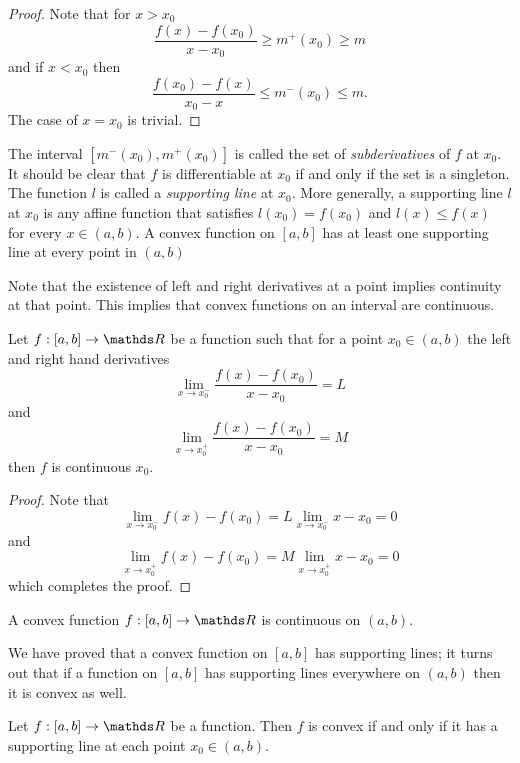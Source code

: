 \begin{proof}
Note that for $x>x_{0}$
\[
\frac{f\left(x\right)-f\left(x_{0}\right)}{x-x_{0}}\geq m^{+}\left(x_{0}\right)\geq m
\]
and if $x<x_{0}$ then 
\[
\frac{f\left(x_{0}\right)-f\left(x\right)}{x_{0}-x}\leq m^{-}\left(x_{0}\right)\leq m.
\]
 The case of $x=x_{0}$ is trivial.
\end{proof}
\begin{rem*}
The interval $\left[m^{-}\left(x_{0}\right),m^{+}\left(x_{0}\right)\right]$
is called the set of \emph{subderivatives }of $f$ at $x_{0}$. It
should be clear that $f$ is differentiable at $x_{0}$ if and only
if the set is a singleton. The function $l$ is called a \emph{supporting
line }at $x_{0}$. More generally, a supporting line $l$ at $x_{0}$
is any affine function that satisfies $l\left(x_{0}\right)=f\left(x_{0}\right)$
and $l\left(x\right)\leq f\left(x\right)$ for every $x\in\left(a,b\right)$.
A convex function on $\left[a,b\right]$ has at least one supporting
line at every point in $\left(a,b\right)$
\end{rem*}
Note that the existence of left and right derivatives at a point implies
continuity at that point. This implies that convex functions on an
interval are continuous.
\begin{prop}
\label{prop:leftRightDerivativeImpliesContinuity}Let $f:\left[a,b\right]\to\R$
be a function such that for a point $x_{0}\in\left(a,b\right)$ the
left and right hand derivatives 
\[
\lim_{x\to x_{0}^{-}}\frac{f\left(x\right)-f\left(x_{0}\right)}{x-x_{0}}=L
\]
and
\[
\lim_{x\to x_{0}^{+}}\frac{f\left(x\right)-f\left(x_{0}\right)}{x-x_{0}}=M
\]
then $f$ is continuous $x_{0}.$
\end{prop}

\begin{proof}
Note that 
\[
\lim_{x\to x_{0}^{-}}f\left(x\right)-f\left(x_{0}\right)=L\lim_{x\to x_{0}^{-}}x-x_{0}=0
\]
and
\[
\lim_{x\to x_{0}^{+}}f\left(x\right)-f\left(x_{0}\right)=M\lim_{x\to x_{0}^{+}}x-x_{0}=0
\]
 which completes the proof.
\end{proof}
\begin{cor}
\label{cor:convexContinuous}A convex function $f:\left[a,b\right]\to\R$
is continuous on $\left(a,b\right).$
\end{cor}

We have proved that a convex function on $\left[a,b\right]$ has supporting
lines; it turns out that if a function on $\left[a,b\right]$ has
supporting lines everywhere on $\left(a,b\right)$ then it is convex
as well.
\begin{prop}
\label{prop:convexSupportingLines}Let $f:\left[a,b\right]\to\R$
be a function. Then $f$ is convex if and only if it has a supporting
line at each point $x_{0}\in\left(a,b\right)$.
\end{prop}

